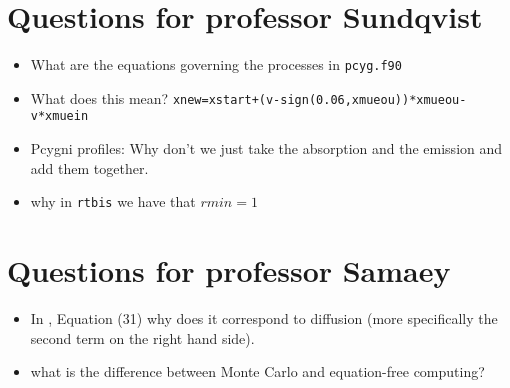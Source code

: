 \documentclass[../main/main.tex]{subfiles}
\begin{document}
\section{Questions for professor Sundqvist}
\begin{itemize}
\item What are the equations governing the processes in \texttt{pcyg.f90} 

\item What does this mean? \texttt{xnew=xstart+(v-sign(0.06,xmueou))*xmueou-v*xmuein}

\item Pcygni profiles: Why don't we just take the absorption and the emission and add them together.

\item why in \texttt{rtbis} we have that $rmin = 1$

\end{itemize}

\section{Questions for professor Samaey}
\begin{itemize}
\item In \cite{Dimarco2018}, Equation (31) why does it correspond to diffusion (more specifically the second term on the right hand side).
\item what is the difference between Monte Carlo and equation-free computing?
\end{itemize}

\newpage
\end{document}
